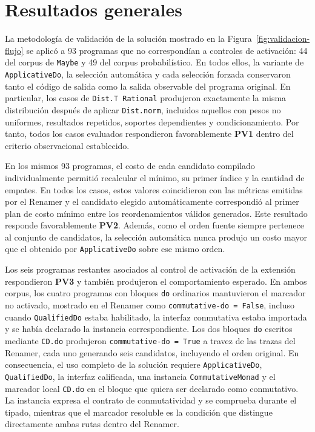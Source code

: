 
\section{Resultados generales}
\label{sec:resultados-generales}

La metodología de validación de la solución mostrado en la Figura~\ref{fig:validacion-flujo} se aplicó a 93 programas que no correspondían a controles de activación: 44 del corpus de \texttt{Maybe} y 49 del corpus probabilístico. En todos ellos, la variante de \texttt{ApplicativeDo}, la selección automática y cada selección forzada conservaron tanto el código de salida como la salida observable del programa original. En particular, los casos de \texttt{Dist.T Rational} produjeron exactamente la misma distribución después de aplicar \texttt{Dist.norm}, incluidos aquellos con pesos no uniformes, resultados repetidos, soportes dependientes y condicionamiento. Por tanto, todos los casos evaluados respondieron favorablemente \textbf{PV1} dentro del criterio observacional establecido.

En los mismos 93 programas, el costo de cada candidato compilado individualmente permitió recalcular el mínimo, su primer índice y la cantidad de empates. En todos los casos, estos valores coincidieron con las métricas emitidas por el Renamer y el candidato elegido automáticamente correspondió al primer plan de costo mínimo entre los reordenamientos válidos generados. Este resultado responde favorablemente \textbf{PV2}. Además, como el orden fuente siempre pertenece al conjunto de candidatos, la selección automática nunca produjo un costo mayor que el obtenido por \texttt{ApplicativeDo} sobre ese mismo orden.

Los seis programas restantes asociados al control de activación de la extensión respondieron \textbf{PV3} y también produjeron el comportamiento esperado. En ambos corpus, los cuatro programas con bloques \texttt{do} ordinarios mantuvieron el marcador no activado, mostrado en el Renamer como \texttt{commutative-do = False}, incluso cuando \texttt{QualifiedDo} estaba habilitado, la interfaz conmutativa estaba importada y se había declarado la instancia correspondiente. Los dos bloques \texttt{do} escritos mediante \texttt{CD.do} produjeron \texttt{commutative-do = True} a travez de las trazas del Renamer, cada uno generando seis candidatos, incluyendo el orden original. En consecuencia, el uso completo de la solución requiere \texttt{ApplicativeDo}, \texttt{QualifiedDo}, la interfaz calificada, una instancia \texttt{CommutativeMonad} y el marcador local \texttt{CD.do} en el bloque que quiera ser declarado como conmutativo. La instancia expresa el contrato de conmutatividad y se comprueba durante el tipado, mientras que el marcador resoluble es la condición que distingue directamente ambas rutas dentro del Renamer.

